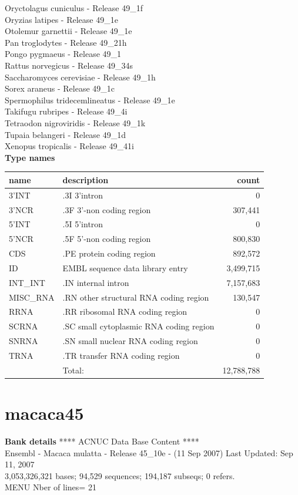 \documentclass{article}
\begin{document}
\begin{Schunk}
 Oryctolagus cuniculus - Release 49\_1f \\
 Oryzias latipes - Release 49\_1e \\
 Otolemur garnettii - Release 49\_1e \\
 Pan troglodytes - Release 49\_21h \\
 Pongo pygmaeus - Release 49\_1 \\
 Rattus norvegicus - Release 49\_34s \\
 Saccharomyces cerevisiae - Release 49\_1h \\
 Sorex araneus - Release 49\_1c \\
 Spermophilus tridecemlineatus - Release 49\_1e \\
 Takifugu rubripes - Release 49\_4i \\
 Tetraodon nigroviridis - Release 49\_1k \\
 Tupaia belangeri - Release 49\_1d \\
 Xenopus tropicalis - Release 49\_41i \\


\textbf{Type names}
\noindent\begin{tabular}{llr}
\hline \hline
name & description & count \\
\hline
3'INT  &  .3I 3'intron  &  0 \\
3'NCR  &  .3F  3'-non coding region  &  307,441 \\
5'INT  &  .5I 5'intron  &  0 \\
5'NCR  &  .5F  5'-non coding region  &  800,830 \\
CDS  &  .PE protein coding region  &  892,572 \\
ID  &  EMBL sequence data library entry  &  3,499,715 \\
INT\_INT  &  .IN  internal intron  &  7,157,683 \\
MISC\_RNA  &  .RN other structural RNA coding region  &  130,547 \\
RRNA  &  .RR ribosomal RNA coding region  &  0 \\
SCRNA  &  .SC small cytoplasmic RNA coding region  &  0 \\
SNRNA  &  .SN small nuclear RNA coding region  &  0 \\
TRNA  &  .TR transfer RNA coding region  &  0 \\
\hline
 & Total: & 12,788,788 \\
\hline \hline
\end{tabular}

\section{ macaca45 }
\textbf{Bank details}
             ****     ACNUC Data Base Content      ****                         \\
Ensembl - Macaca mulatta - Release 45\_10e - (11 Sep 2007) Last Updated: Sep 11, 2007\\
3,053,326,321 bases; 94,529 sequences; 194,187 subseqs; 0 refers.\\
MENU Nber of lines= 21                                                         


\end{Schunk}
\end{document}
